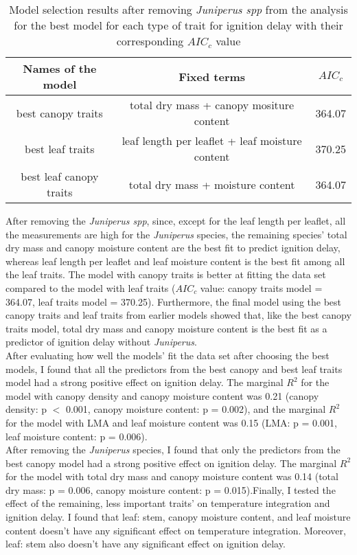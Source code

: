 \documentclass[12pt]{report}
\begin{document}
\begin{table}
\centering
\begin{tabular}{|c | c | c|}
      \hline
      \textbf{Names of the model} & \textbf{Fixed terms} & \textbf{$AIC_{c}$} \\
       \hline
       best canopy traits  & total dry mass + canopy mositure content & 364.07 \\
       \hline
       best leaf traits    & leaf length per leaflet + leaf moisture content & 370.25 \\
       \hline
       best leaf canopy traits   & total dry mass + moisture content & 364.07\\
       \hline
\end{tabular}
\caption{Model selection results after removing \emph{Juniperus spp} from the  analysis  for the best model for each type of trait for ignition delay with their corresponding $AIC_{c}$ value}
\end{table} 


After removing the \emph{Juniperus spp}, since, except for the leaf length per leaflet, all the measurements are high for the \emph{Juniperus} species, the remaining species' total dry mass and canopy moisture content are the best fit to predict ignition delay, whereas leaf length per leaflet and leaf moisture content is the best fit among all the leaf traits. The model with canopy traits is better at fitting the data set compared to the model with leaf traits ($AIC_{c}$ value: canopy traits model = 364.07, leaf traits model = 370.25).  Furthermore, the final model using the best canopy traits and leaf traits from earlier models showed that, like the best canopy traits model, total dry mass and canopy moisture content is the best fit as a predictor of ignition delay without \emph{Juniperus}. \\

After evaluating how well the models’ fit the data set after choosing the best models, I found that all the predictors from the best canopy and best leaf traits model had a strong positive effect on ignition delay. The marginal $R^2$ for the model with canopy density and canopy moisture content was 0.21 (canopy density: p $<$ 0.001, canopy moisture content: p = 0.002), and the marginal $R^2$ for the model with LMA and leaf moisture content was 0.15 (LMA: p = 0.001, leaf moisture content: p = 0.006). \\

After removing the \emph{Juniperus} species, I found that only the predictors from the best canopy model had a strong positive effect on ignition delay. The marginal $R^2$ for the model with total dry mass and canopy moisture content was 0.14 (total dry mass: p = 0.006, canopy moisture content: p = 0.015).Finally, I tested the effect of the remaining, less important traits' on temperature integration and ignition delay. I found that leaf: stem, canopy moisture content, and leaf moisture content doesn't have any significant effect on temperature integration. Moreover, leaf: stem also doesn't have any significant effect on ignition delay.
\end{document}
